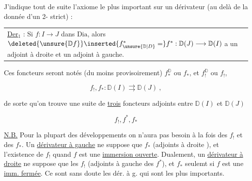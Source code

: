 
J'indique tout de suite l'axiome le plus important sur un dérivateur (au delà de la donnée d'un 2- strict) :

\begin{tabular}{||p{.88\linewidth}}
\uline{Der}$_{1}$ : Si $f:I\longrightarrow J$ dans $\mathrm{Dia}$, alors $\deleted{\unsure{\mathbb D f}}\inserted{f^{*}_{\unsure{\mathbb D|D}}=}f^{*}:\mathbb D(J)\longrightarrow\mathbb D(I)$ a un adjoint à droite et un adjoint à gauche.
\end{tabular}

Ces foncteurs seront notés (du moins provisoirement) $f_{*}^{\mathbb D}$ ou $f_{*}$, et $f_{!}^{\mathbb D}$ ou $f_{!}$,

\[
f_{!},f_{*}:\mathbb D(I)\rightrightarrows\mathbb D(J)\ ,
\]

de sorte qu'on trouve une suite de \uline{trois} foncteurs adjoints entre $\mathbb D(I)$ et $\mathbb D(J)$

\[
f_{!}, f^{*}, f_{*}
\]

\uline{N.B.} Pour  la plupart des développements on n'aura pas besoin  à la fois des $f_{!}$ et des $f_{*}$. Un \uline{dérivateur à gauche} ne suppose que  $f_{*}$ (adjoints à droite ), et l'existence de $f_{!}$  quand $f$ est une \uline{immersion ouverte}. Dualement, un \uline{dérivateur à droite} ne suppose que les $f_{!}$ (adjoints à gauche des $f^{*}$), et $f_{*}$ seulemt si $f$ est une \uline{imm. fermée}. Ce sont sans doute les dér. à g. qui sont les plus importants.

